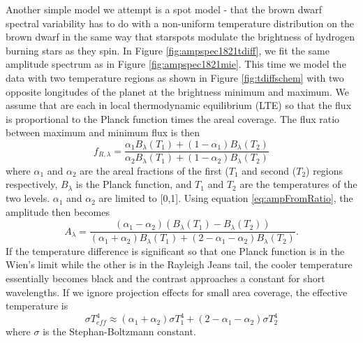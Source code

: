 \documentclass[twocolumn]{aastex6}
\begin{document}
Another simple model we attempt is a spot model - that the brown dwarf spectral variability has to do with a non-uniform temperature distribution on the brown dwarf in the same way that starspots modulate the brightness of hydrogen burning stars as they spin.
In Figure \ref{fig:ampspec1821tdiff}, we fit the same amplitude spectrum as in Figure \ref{fig:ampspec1821mie}.
This time we model the data with two temperature regions as shown in Figure \ref{fig:tdiffschem} with two opposite longitudes of the planet at the brightness minimum and maximum.
We assume that are each in local thermodynamic equilibrium (LTE) so that the flux is proportional to the Planck function times the areal coverage.
The flux ratio between maximum and minimum flux is then
\begin{equation}
f_{R,\lambda} = \frac{\alpha_1 B_\lambda(T_1) + (1-\alpha_1) B_\lambda(T_2)}{\alpha_2 B_\lambda(T_1) + (1-\alpha_2) B_\lambda(T_2)}
\end{equation}
where $\alpha_1$ and $\alpha_2$ are the areal fractions of the first ($T_1$ and second ($T_2$) regions respectively, $B_\lambda$ is the Planck function, and $T_1$ and $T_2$ are the temperatures of the two levels.
$\alpha_1$ and $\alpha_2$ are limited to [0,1].
Using equation \ref{eq:ampFromRatio}, the amplitude then becomes
\begin{equation}
A_\lambda = \frac{\left(\alpha_1 - \alpha_2 \right) \left(B_\lambda(T_1) - B_\lambda(T_2) \right)}{\left(\alpha_1 + \alpha_2\right) B_\lambda(T_1) + \left(2 - \alpha_1 - \alpha_2\right) B_\lambda(T_2)}.
\end{equation}
If the temperature difference is significant so that one Planck function is in the Wien's limit while the other is in the Rayleigh Jeans tail, the cooler temperature essentially becomes black and the contrast approaches a constant for short wavelengths.
If we ignore projection effects for small area coverage, the effective temperature is 
\begin{equation}
\sigma T_{eff}^4 \approx (\alpha_1 + \alpha_2) \sigma T_1^4 + (2 - \alpha_1 - \alpha_2) \sigma T_2^4
\end{equation}
where $\sigma$ is the Stephan-Boltzmann constant.
\end{document}

